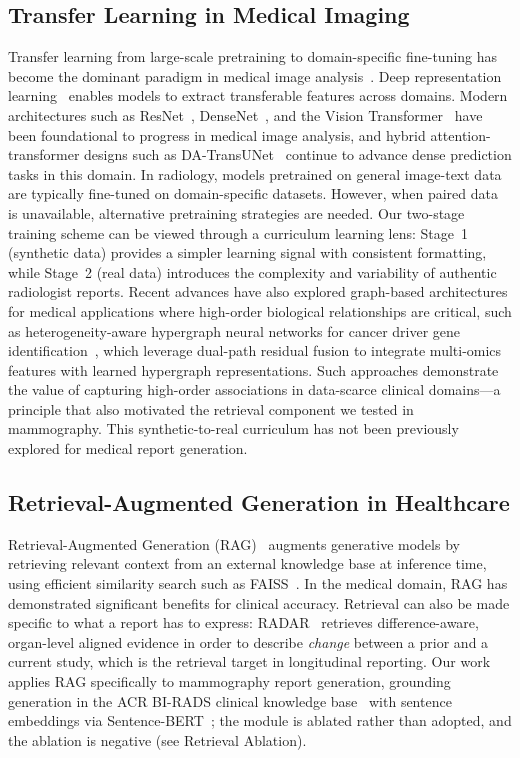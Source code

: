 \documentclass{wlscirep}
\begin{document}
\subsection*{Transfer Learning in Medical Imaging}

Transfer learning from large-scale pretraining to domain-specific fine-tuning has become the dominant paradigm in medical image analysis~\cite{pan2010transfer, zhuang2021survey}. Deep representation learning~\cite{bengio2012deep} enables models to extract transferable features across domains. Modern architectures such as ResNet~\cite{he2016deep}, DenseNet~\cite{huang2017densely}, and the Vision Transformer~\cite{dosovitskiy2021vit} have been foundational to progress in medical image analysis, and hybrid attention-transformer designs such as DA-TransUNet~\cite{sun2024datransunet} continue to advance dense prediction tasks in this domain. In radiology, models pretrained on general image-text data are typically fine-tuned on domain-specific datasets. However, when paired data is unavailable, alternative pretraining strategies are needed. Our two-stage training scheme can be viewed through a curriculum learning lens: Stage~1 (synthetic data) provides a simpler learning signal with consistent formatting, while Stage~2 (real data) introduces the complexity and variability of authentic radiologist reports. Recent advances have also explored graph-based architectures for medical applications where high-order biological relationships are critical, such as heterogeneity-aware hypergraph neural networks for cancer driver gene identification~\cite{chen2026dprehgnn}, which leverage dual-path residual fusion to integrate multi-omics features with learned hypergraph representations. Such approaches demonstrate the value of capturing high-order associations in data-scarce clinical domains---a principle that also motivated the retrieval component we tested in mammography. This synthetic-to-real curriculum has not been previously explored for medical report generation.

\subsection*{Retrieval-Augmented Generation in Healthcare}

Retrieval-Augmented Generation (RAG)~\cite{lewis2020rag} augments generative models by retrieving relevant context from an external knowledge base at inference time, using efficient similarity search such as FAISS~\cite{johnson2020faiss}. In the medical domain, RAG has demonstrated significant benefits for clinical accuracy. Retrieval can also be made specific to what a report has to express: RADAR~\cite{pan2026radar} retrieves difference-aware, organ-level aligned evidence in order to describe \emph{change} between a prior and a current study, which is the retrieval target in longitudinal reporting. Our work applies RAG specifically to mammography report generation, grounding generation in the ACR BI-RADS clinical knowledge base~\cite{birads2013} with sentence embeddings via Sentence-BERT~\cite{reimers2019sentencebert}; the module is ablated rather than adopted, and the ablation is negative (see Retrieval Ablation).
\end{document}
